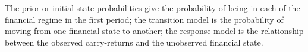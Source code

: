 \documentclass[12pt, a4paper, oneside]{article}\usepackage[]{graphicx}\usepackage[]{color}
\begin{document}

The prior or initial state probabilities give the probability of being in each of the financial regime in the first period; the transition model is the probability of moving from one financial state to another; the response model is the relationship between the observed carry-returns and the unobserved financial state.  
\end{document}
